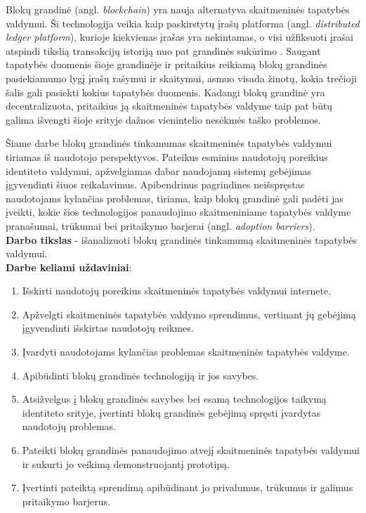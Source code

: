 Blokų grandinė (angl. \textit{blockchain}) yra nauja alternatyva skaitmeninės tapatybės valdymui. Ši technologija veikia kaip
paskirstytų įrašų platforma (angl. \textit{distributed ledger platform}), kurioje kiekvienas įrašas yra nekintamas, o visi
užfiksuoti įrašai atspindi tikslią transakcijų istoriją nuo pat grandinės sukūrimo \cite{Baars2016}. Saugant tapatybės duomenis šioje grandinėje ir
pritaikius reikiamą blokų grandinės pasiekiamumo lygį įrašų rašymui ir skaitymui, asmuo visada
žinotų, kokia trečioji šalis gali pasiekti kokius tapatybės duomenis. Kadangi blokų grandinė yra decentralizuota, pritaikius ją skaitmeninės tapatybės valdyme taip pat
būtų galima išvengti šioje srityje dažnos vienintelio nesėkmės taško problemos. 

Šiame darbe blokų grandinės tinkamumas skaitmeninės tapatybės valdymui tiriamas iš naudotojo perspektyvos.
Pateikus esminius naudotojų poreikius identiteto valdymui,
apžvelgiamas dabar naudojamų sistemų gebėjimas įgyvendinti šiuos reikalavimus. Apibendrinus pagrindines neišspręstas naudotojams kylančias problemas,
tiriama, kaip blokų grandinė gali padėti jas įveikti, kokie šios technologijos panaudojimo skaitmeniniame tapatybės valdyme
pranašumai, trūkumai bei pritaikymo barjerai (angl. \textit{adoption barriers}).
\\

\textbf{Darbo tikslas} - išanalizuoti blokų grandinės tinkamumą skaitmeninės tapatybės valdymui.
\\

\textbf{Darbe keliami uždaviniai}:

\begin{enumerate}
    \item Išskirti naudotojų poreikius skaitmeninės tapatybės valdymui internete.
    \item Apžvelgti skaitmeninės tapatybės valdymo sprendimus, vertinant jų gebėjimą įgyvendinti išskirtas naudotojų reikmes.
    \item Įvardyti naudotojams kylančias problemas skaitmeninės tapatybės valdyme.
    \item Apibūdinti blokų grandinės technologiją ir jos savybes.
    \item Atsižvelgus į blokų grandinės savybes bei esamą technologijos taikymą identiteto srityje,
    įvertinti blokų grandinės gebėjimą spręsti įvardytas naudotojų problemas.
    \item Pateikti blokų grandinės panaudojimo atvejį skaitmeninės tapatybės valdymui ir sukurti jo veikimą demonstruojantį prototipą.
    \item Įvertinti pateiktą sprendimą apibūdinant jo privalumus, trūkumus ir galimus pritaikymo barjerus.
\end{enumerate}